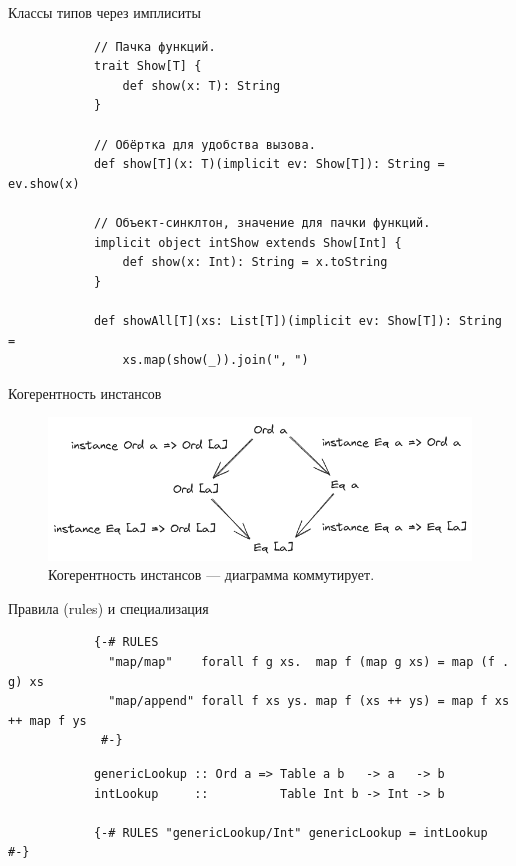     \begin{frame}[fragile]{Классы типов через имплиситы}
        \pause
        \begin{verbatim}
            // Пачка функций.
            trait Show[T] {
                def show(x: T): String
            }

            // Обёртка для удобства вызова.
            def show[T](x: T)(implicit ev: Show[T]): String = ev.show(x)

            // Объект-синклтон, значение для пачки функций.
            implicit object intShow extends Show[Int] {
                def show(x: Int): String = x.toString
            }

            def showAll[T](xs: List[T])(implicit ev: Show[T]): String =
                xs.map(show(_)).join(", ")
        \end{verbatim}
    \end{frame}

    \begin{frame}[fragile]{Когерентность инстансов}
        \begin{figure}
            \centering
            \includegraphics[width=0.8\linewidth]{figs/coherence}
            \caption{Когерентность инстансов --- диаграмма коммутирует.}
            \label{fig:coherence}
        \end{figure}
    \end{frame}

    \begin{frame}[fragile]{Правила (rules) и специализация}
        \pause
        \begin{verbatim}
            {-# RULES
              "map/map"    forall f g xs.  map f (map g xs) = map (f . g) xs
              "map/append" forall f xs ys. map f (xs ++ ys) = map f xs ++ map f ys
             #-}
        \end{verbatim}
        \pause\vspace{1em}
        \begin{verbatim}
            genericLookup :: Ord a => Table a b   -> a   -> b
            intLookup     ::          Table Int b -> Int -> b

            {-# RULES "genericLookup/Int" genericLookup = intLookup #-}
        \end{verbatim}
    \end{frame}

